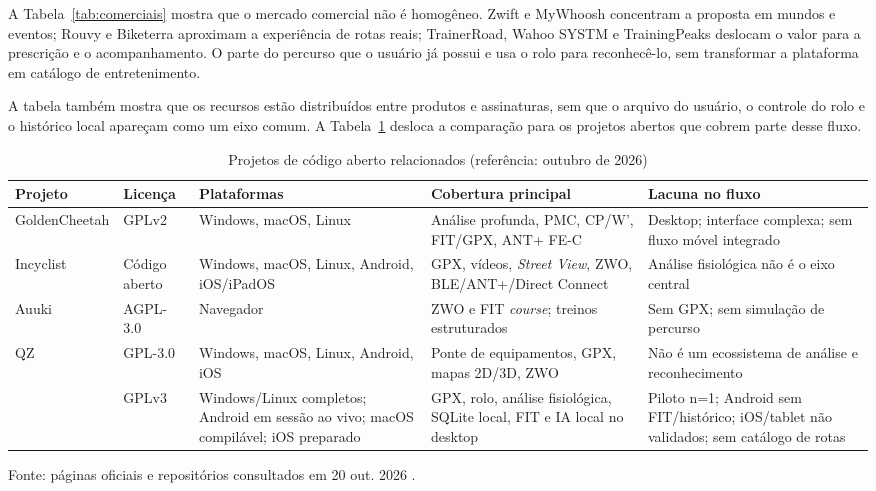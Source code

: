 A Tabela~\ref{tab:comerciais} mostra que o mercado comercial não é homogêneo.
Zwift e MyWhoosh concentram a proposta em mundos e eventos; Rouvy e Biketerra
aproximam a experiência de rotas reais; TrainerRoad, Wahoo SYSTM e TrainingPeaks
deslocam o valor para a prescrição e o acompanhamento. O \argus{} parte do
percurso que o usuário já possui e usa o rolo para reconhecê-lo, sem transformar
a plataforma em catálogo de entretenimento.

A tabela também mostra que os recursos estão distribuídos entre produtos e
assinaturas, sem que o arquivo do usuário, o controle do rolo e o histórico
local apareçam como um eixo comum. A Tabela~\ref{tab:abertos} desloca a
comparação para os projetos abertos que cobrem parte desse fluxo.

\clearpage

\begin{table}[t]
    \centering
    \caption{Projetos de código aberto relacionados (referência: outubro de 2026)}
    \label{tab:abertos}
    \footnotesize
    \renewcommand{\arraystretch}{1.15}
    \setlength{\tabcolsep}{4pt}
    \begin{tabular}{@{}>{\raggedright\arraybackslash}p{2.6cm}
        >{\raggedright\arraybackslash}p{2.2cm}
        >{\raggedright\arraybackslash}p{3.1cm}
        >{\raggedright\arraybackslash}p{4.0cm}
        >{\raggedright\arraybackslash}p{2.8cm}@{}
    }
        \toprule
        \textbf{Projeto} & \textbf{Licença} & \textbf{Plataformas} &
        \textbf{Cobertura principal} & \textbf{Lacuna no fluxo} \\
        \midrule
        GoldenCheetah & GPLv2 &
        Windows, macOS, Linux &
        Análise profunda, PMC, CP/W', FIT/GPX, ANT+ FE-C &
        Desktop; interface complexa; sem fluxo móvel integrado \\
        Incyclist & Código aberto &
        Windows, macOS, Linux, Android, iOS/iPadOS &
        GPX, vídeos, \textit{Street View}, ZWO, BLE/ANT+/Direct Connect &
        Análise fisiológica não é o eixo central \\
        Auuki & AGPL-3.0 &
        Navegador &
        ZWO e FIT \textit{course}; treinos estruturados &
        Sem GPX; sem simulação de percurso \\
        QZ & GPL-3.0 &
        Windows, macOS, Linux, Android, iOS &
        Ponte de equipamentos, GPX, mapas 2D/3D, ZWO &
        Não é um ecossistema de análise e reconhecimento \\
        \argus{} & GPLv3 &
        Windows/Linux completos; Android em sessão ao vivo; macOS compilável;
        iOS preparado &
        GPX, rolo, análise fisiológica, SQLite local, FIT e IA local no
        desktop &
        Piloto n=1; Android sem FIT/histórico; iOS/tablet não validados; sem
        catálogo de rotas \\
        \bottomrule
    \end{tabular}
    \vspace{0.2cm}
    \par\small Fonte: páginas oficiais e repositórios consultados em 20 out. 2026
    \cite{goldencheetah_site,incyclist_site,auuki_site,qz_github}.
\end{table}

